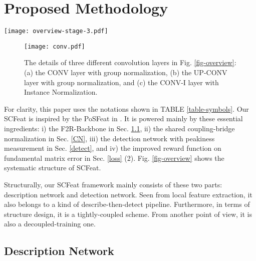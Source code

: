 \documentclass[journal]{IEEEtran}
\begin{document}
\section{Proposed Methodology}

\begin{figure*}[ht]
\centering
\texttt{[image: overview-stage-3.pdf]} \caption{Systematical structure of proposed SCFeat: (a) description network, (b) shared coupling-bridge normalization, and (c) detection network.}
\label{fig-overview}
\end{figure*}

\begin{figure}[t]
\centering
\texttt{[image: conv.pdf]} \caption{The details of three different convolution layers in Fig. \ref{fig-overview}: (a) the CONV layer with group normalization, (b) the UP-CONV layer with group normalization, and (c) the CONV-I layer with Instance Normalization.}
\label{fig3conv}
\end{figure}



For clarity, this paper uses the notations shown in TABLE \ref{table-symbols}. Our SCFeat is inspired by the PoSFeat in \cite{li2022decoupling}. It is powered mainly by these essential ingredients: i) the F2R-Backbone in Sec. \ref{description}, ii) the shared coupling-bridge normalization in Sec. \ref{CN}, iii) the detection network with peakiness measurement in Sec. \ref{detect}, and iv) the improved reward function on fundamental matrix error in Sec. \ref{loss} (2). Fig. \ref{fig-overview} shows the systematic structure of SCFeat.



Structurally, our SCFeat framework mainly consists of these two parts: description network and detection network. Seen from local feature extraction, it also belongs to a kind of describe-then-detect pipeline. Furthermore, in terms of structure design, it is a tightly-coupled scheme. From another point of view, it is also a decoupled-training one.













\subsection{Description Network} \label{description}
\end{document}
